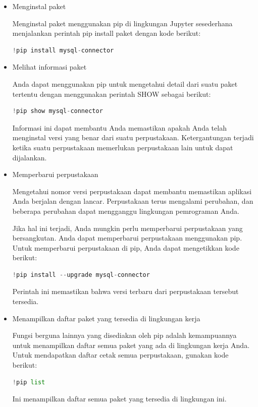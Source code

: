 \documentclass{article}
\begin{document}
\begin{itemize}
      \item Menginstal paket

            Menginstal paket menggunakan pip di lingkungan Jupyter sesederhana menjalankan perintah pip install paket dengan kode berikut:

            \begin{lstlisting}[language=Python, caption={}, captionpos=b]
    !pip install mysql-connector
    \end{lstlisting}

      \item Melihat informasi paket

            Anda dapat menggunakan pip untuk mengetahui detail dari suatu paket tertentu dengan menggunakan perintah SHOW sebagai berikut:
            \begin{lstlisting}[language=Python, caption={}, captionpos=b]
!pip show mysql-connector
\end{lstlisting}
            Informasi ini dapat membantu Anda memastikan apakah Anda telah menginstal versi yang benar dari suatu perpustakaan. Ketergantungan terjadi ketika suatu perpustakaan memerlukan perpustakaan lain untuk dapat dijalankan.

      \item Memperbarui perpustakaan

            Mengetahui nomor versi perpustakaan dapat membantu memastikan aplikasi Anda berjalan dengan lancar. Perpustakaan terus mengalami perubahan, dan beberapa perubahan dapat mengganggu lingkungan pemrograman Anda.

            Jika hal ini terjadi, Anda mungkin perlu memperbarui perpustakaan yang bersangkutan. Anda dapat memperbarui perpustakaan menggunakan pip. Untuk memperbarui perpustakaan di pip, Anda dapat mengetikkan kode berikut:
            \begin{lstlisting}[language=Python, caption={}, captionpos=b]
!pip install --upgrade mysql-connector
\end{lstlisting}

            Perintah ini memastikan bahwa versi terbaru dari perpustakaan tersebut tersedia.

      \item Menampilkan daftar paket yang tersedia di lingkungan kerja

            Fungsi berguna lainnya yang disediakan oleh pip adalah kemampuannya untuk menampilkan daftar semua paket yang ada di lingkungan kerja Anda. Untuk mendapatkan daftar cetak semua perpustakaan, gunakan kode berikut:
            \begin{lstlisting}[language=Python, caption={}, captionpos=b]
!pip list
\end{lstlisting}
            Ini menampilkan daftar semua paket yang tersedia di lingkungan ini.


\end{itemize}
\end{document}

